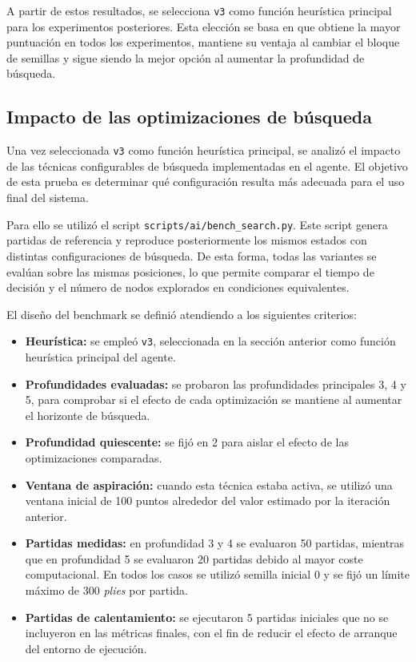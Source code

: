A partir de estos resultados, se selecciona \texttt{v3} como función heurística principal para los experimentos posteriores. Esta elección se basa en que obtiene la mayor puntuación en todos los experimentos, mantiene su ventaja al cambiar el bloque de semillas y sigue siendo la mejor opción al aumentar la profundidad de búsqueda.


\subsection{Impacto de las optimizaciones de búsqueda}
\label{subsec:impacto-optimizaciones-busqueda}

Una vez seleccionada \texttt{v3} como función heurística principal, se analizó el impacto de las técnicas configurables de búsqueda implementadas en el agente. El objetivo de esta prueba es determinar qué configuración resulta más adecuada para el uso final del sistema.

Para ello se utilizó el script \texttt{scripts/ai/bench\_search.py}. Este script genera partidas de referencia y reproduce posteriormente los mismos estados con distintas configuraciones de búsqueda. De esta forma, todas las variantes se evalúan sobre las mismas posiciones, lo que permite comparar el tiempo de decisión y el número de nodos explorados en condiciones equivalentes.

El diseño del benchmark se definió atendiendo a los siguientes criterios:

\begin{itemize}
    \item \textbf{Heurística:} se empleó \texttt{v3}, seleccionada en la sección anterior como función heurística principal del agente.

    \item \textbf{Profundidades evaluadas:} se probaron las profundidades principales 3, 4 y 5, para comprobar si el efecto de cada optimización se mantiene al aumentar el horizonte de búsqueda.

    \item \textbf{Profundidad quiescente:} se fijó en 2 para aislar el efecto de las optimizaciones comparadas.

    \item \textbf{Ventana de aspiración:} cuando esta técnica estaba activa, se utilizó una ventana inicial de 100 puntos alrededor del valor estimado por la iteración anterior.
    
    \item \textbf{Partidas medidas:} en profundidad 3 y 4 se evaluaron 50 partidas, mientras que en profundidad 5 se evaluaron 20 partidas debido al mayor coste computacional. En todos los casos se utilizó semilla inicial 0 y se fijó un límite máximo de 300 \textit{plies} por partida.

    \item \textbf{Partidas de calentamiento:} se ejecutaron 5 partidas iniciales que no se incluyeron en las métricas finales, con el fin de reducir el efecto de arranque del entorno de ejecución.
\end{itemize}

